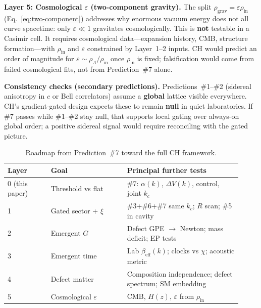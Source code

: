 \documentclass[11pt,a4paper]{article}
\begin{document}
\textbf{Layer 5: Cosmological $\varepsilon$ (two-component gravity).}
The split $\rho_{\mathrm{grav}} = \varepsilon \rho_{\mathrm{in}}$ (Eq.~\ref{eq:two-component}) addresses why enormous vacuum energy does not all curve spacetime: only $\varepsilon \ll 1$ gravitates cosmologically.
This is \textbf{not} testable in a Casimir cell.
It requires cosmological data---expansion history, CMB, structure formation---with $\rho_{\mathrm{in}}$ and $\varepsilon$ constrained by Layer~1--2 inputs.
CH would predict an order of magnitude for $\varepsilon \sim \rho_\Lambda / \rho_{\mathrm{in}}$ once $\rho_{\mathrm{in}}$ is fixed; falsification would come from failed cosmological fits, not from Prediction~\#7 alone.

\textbf{Consistency checks (secondary predictions).}
Predictions~\#1--\#2 (sidereal anisotropy in $c$ or Bell correlators) assume a \textbf{global} lattice visible everywhere.
CH's gradient-gated design expects these to remain \textbf{null} in quiet laboratories.
If \#7 passes while \#1--\#2 stay null, that supports local gating over always-on global order; a positive sidereal signal would require reconciling with the gated picture.

\begin{table}[htbp]
  \centering
  \small
  \caption{Roadmap from Prediction~\#7 toward the full CH framework.}
  \label{tab:roadmap}
  \begin{tabular}{@{}p{0.17\linewidth}p{0.30\linewidth}p{0.45\linewidth}@{}}
    \toprule
    Layer & Goal & Principal further tests \\
    \midrule
    0 (this paper) &
    Threshold vs flat &
    \#7: $\alpha(k)$, $\Delta V(k)$, control, joint $k_c$ \\
    1 &
    Gated sector + $\xi$ &
    \#3+\#6+\#7 same $k_c$; $R$ scan; \#5 in cavity \\
    2 &
    Emergent $G$ &
    Defect GPE $\to$ Newton; mass deficit; EP tests \\
    3 &
    Emergent time &
    Lab $\beta_{\mathrm{eff}}(k)$; clocks vs $\chi$; acoustic metric \\
    4 &
    Defect matter &
    Composition independence; defect spectrum; SM embedding \\
    5 &
    Cosmological $\varepsilon$ &
    CMB, $H(z)$, $\varepsilon$ from $\rho_{\mathrm{in}}$ \\
    \bottomrule
  \end{tabular}
\end{table}
\end{document}

